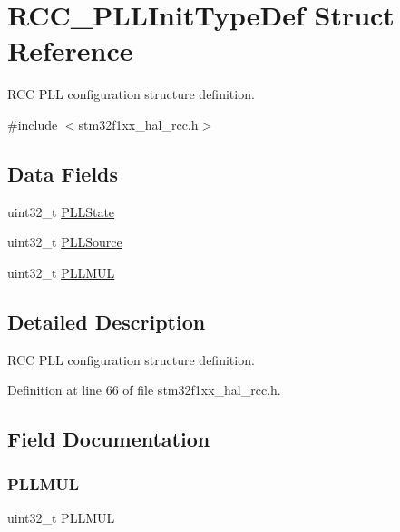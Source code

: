 \hypertarget{struct_r_c_c___p_l_l_init_type_def}{}\section{R\+C\+C\+\_\+\+P\+L\+L\+Init\+Type\+Def Struct Reference}
\label{struct_r_c_c___p_l_l_init_type_def}


R\+CC P\+LL configuration structure definition.  




{\ttfamily \#include $<$stm32f1xx\+\_\+hal\+\_\+rcc.\+h$>$}

\subsection*{Data Fields}
\begin{DoxyCompactItemize}
\item 
uint32\+\_\+t \hyperlink{struct_r_c_c___p_l_l_init_type_def_ab3bb33f461bb409576e1c899c962e0b0}{P\+L\+L\+State}
\item 
uint32\+\_\+t \hyperlink{struct_r_c_c___p_l_l_init_type_def_a418ecda4a355c6a161e4893a7bc1897f}{P\+L\+L\+Source}
\item 
uint32\+\_\+t \hyperlink{struct_r_c_c___p_l_l_init_type_def_a4a57e48e8e939695ff2a76456e6360ef}{P\+L\+L\+M\+UL}
\end{DoxyCompactItemize}


\subsection{Detailed Description}
R\+CC P\+LL configuration structure definition. 

Definition at line 66 of file stm32f1xx\+\_\+hal\+\_\+rcc.\+h.



\subsection{Field Documentation}
\mbox{\label{struct_r_c_c___p_l_l_init_type_def_a4a57e48e8e939695ff2a76456e6360ef}} 
\subsubsection{\texorpdfstring{P\+L\+L\+M\+UL}{PLLMUL}}
{\footnotesize\ttfamily uint32\+\_\+t P\+L\+L\+M\+UL}

